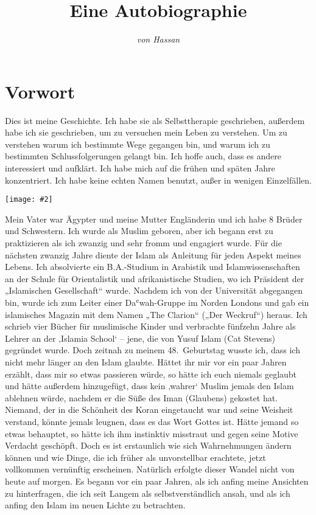 \documentclass[12pt]{memoir}
\title{Eine Autobiographie}
\author{\emph{von Hassan}}
\def\`{ʿ} %
\newcommand{\img}[3]{\begin{center}%
\texttt{[image: \#2]}\\{\small\em#3}%
\end{center}}
\begin{document}
\frontmatter

\maketitle
\thispagestyle{empty}
\cleardoublepage

\setcounter{page}{1}
\tableofcontents

\chapter{Vorwort}

Dies ist meine Geschichte. Ich habe sie als Selbsttherapie geschrieben,
außerdem habe ich sie geschrieben, um zu versuchen mein Leben zu verstehen.
Um zu verstehen warum ich bestimmte Wege gegangen bin,
und warum ich zu bestimmten Schlussfolgerungen gelangt bin.
Ich hoffe auch, dass es andere interessiert und aufklärt.
Ich habe mich auf die frühen und späten Jahre konzentriert.
Ich habe keine echten Namen benutzt, außer in wenigen Einzelfällen.

\img{scale=0.1}{Tunis_Hassan.jpg}{}

Mein Vater war Ägypter und meine Mutter Engländerin
und ich habe 8 Brüder und Schwestern.
Ich wurde als Muslim geboren, aber ich begann erst zu praktizieren
als ich zwanzig und sehr fromm und engagiert wurde.
Für die nächsten zwanzig Jahre diente der Islam als Anleitung
für jeden Aspekt meines Lebens.
Ich absolvierte ein B.A.-Studium in Arabistik und Islamwissenschaften
an der Schule für Orientalistik und afrikanistische Studien,
wo ich Präsident der „Islamischen Gesellschaft“ wurde.
Nachdem ich von der Universität abgegangen bin,
wurde ich zum Leiter einer Da\`wah-Gruppe im Norden Londons
und gab ein islamisches Magazin mit dem Namen
„The Clarion“ („Der Weckruf“) heraus.
Ich schrieb vier Bücher für muslimische Kinder
und verbrachte fünfzehn Jahre als Lehrer an der ‚Islamia School‘ –
jene, die von Yusuf Islam (Cat Stevens) gegründet wurde.
Doch zeitnah zu meinem 48.\ Geburtstag wusste ich,
dass ich nicht mehr länger an den Islam glaubte.
Hättet ihr mir vor ein paar Jahren erzählt,
dass mir so etwas passieren würde,
so hätte ich euch niemals geglaubt und hätte außerdem hinzugefügt,
dass kein ‚wahrer‘ Muslim jemals den Islam ablehnen würde,
nachdem er die Süße des Iman (Glaubens) gekostet hat.
Niemand, der in die Schönheit des Koran eingetaucht war
und seine Weisheit verstand, könnte jemals leugnen,
dass es das Wort Gottes ist. Hätte jemand so etwas behauptet,
so hätte ich ihm instinktiv misstraut
und gegen seine Motive Verdacht geschöpft.
Doch es ist erstaunlich wie sich Wahrnehmungen ändern können und wie Dinge,
die ich früher als unvorstellbar erachtete,
jetzt vollkommen vernünftig erscheinen.
Natürlich erfolgte dieser Wandel nicht von heute auf morgen.
Es begann vor ein paar Jahren,
als ich anfing meine Ansichten zu hinterfragen,
die ich seit Langem als selbstverständlich ansah,
und als ich anfing den Islam im neuen Lichte zu betrachten.
\end{document}
